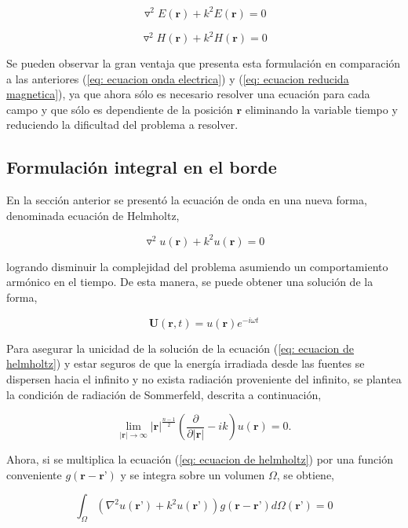 \documentclass[12pt,letterpaper]{article}
\numberwithin{equation}{section}
\begin{document}
\begin{equation}
\triangledown^2E(\textbf{r})+k^2E(\textbf{r})=0
\label{eq:Helmholtz electrico}
\end{equation}

\begin{equation}
\triangledown^2H(\textbf{r})+k^2H(\textbf{r})=0
\label{eq:Helmholtz magnetico}
\end{equation}

Se pueden observar la gran ventaja que presenta esta formulación en comparación a las anteriores (\ref{eq: ecuacion onda electrica}) y (\ref{eq: ecuacion reducida magnetica}), ya que ahora sólo es necesario resolver una ecuación para cada campo y que sólo es dependiente de la posición $\textbf{r}$ eliminando la variable tiempo y reduciendo la dificultad del problema a resolver.
\pagebreak
\subsection{Formulación integral en el borde}
En la sección anterior se presentó la ecuación de onda en una nueva forma, denominada ecuación de Helmholtz, 

$$\triangledown^2u(\textbf{r})+k^2u(\textbf{r})=0$$

logrando disminuir la complejidad del problema asumiendo un comportamiento armónico en el tiempo. De esta manera, se puede obtener una solución de la forma,

$$\textbf{U}(\textbf{r},t) = u(\textbf{r})e^{-i\omega t}$$ 

Para asegurar la unicidad de la solución de la ecuación (\ref{eq: ecuacion de helmholtz}) y estar seguros de que la energía irradiada desde las fuentes se dispersen hacia el infinito y no exista radiación proveniente del infinito, se plantea la condición de radiación de Sommerfeld, descrita a continuación,

\begin{equation}
\lim\limits_{|\textbf{r}|\rightarrow\infty}|\textbf{r}|^{\frac{n-1}{2}}\left(\frac{\partial}{\partial|\textbf{r}|}-ik\right)u(\textbf{r})=0.
\label{eq:Sommerfeld radiation condition}
\end{equation} 

Ahora, si se multiplica la ecuación (\ref{eq: ecuacion de helmholtz}) por una función conveniente $g(\textbf{r}-\textbf{r'})$ y se integra sobre un volumen $\Omega$, se obtiene,

\begin{equation}
	\int_{\Omega}(\nabla^2u(\textbf{r'})+k^2u(\textbf{r'}))g(\textbf{r}-\textbf{r'})d\varOmega(\textbf{r'})=0
	\label{eq:Helmholtz*Green}
\end{equation}
\end{document}
